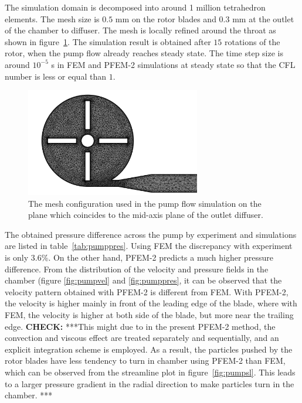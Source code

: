 The simulation domain is decomposed into around 1 million tetrahedron elements. The mesh size is $0.5$ mm on the rotor blades and $0.3$ mm at the outlet of the chamber to diffuser. The mesh is locally refined around the throat as shown in figure~\ref{fig:pumpmesh}. The simulation result is obtained after $15$ rotations of the rotor, when the pump flow already reaches steady state. The time step size is around $10^{-5}$ s in FEM and PFEM-2 simulations at steady state so that the CFL number is less or equal than $1$.  

\begin{figure}[htbp]
    \centering
    \includegraphics[width=3in]{imgs/nozzle_pump/pump_mesh.pdf}
    \caption{The mesh configuration used in the pump flow simulation on the plane which coincides to the mid-axis plane of the outlet diffuser.}
    \label{fig:pumpmesh}
\end{figure}


The obtained pressure difference across the pump by experiment and simulations are listed in table~\ref{tab:pumppres}. Using FEM the discrepancy with experiment is only $3.6$\%. On the other hand, PFEM-2 predicts a much higher pressure difference. From the distribution of the velocity and pressure fields in the chamber (figure \ref{fig:pumpvel} and \ref{fig:pumppres}, it can be observed that the velocity pattern obtained with PFEM-2 is different from FEM. With PFEM-2, the velocity is higher mainly in front of the leading edge of the blade, where with FEM, the velocity is higher at both side of the blade, but more near the trailing edge. \textbf{CHECK:} ***This might due to in the present PFEM-2 method, the convection and viscous effect are treated separately and sequentially, and an explicit integration scheme is employed. As a result, the particles pushed by the rotor blades have less tendency to turn in chamber using PFEM-2 than FEM, which can be observed from the streamline plot in figure~\ref{fig:pumpsl}. This leads to a larger pressure gradient in the radial direction to make particles turn in the chamber. ***

